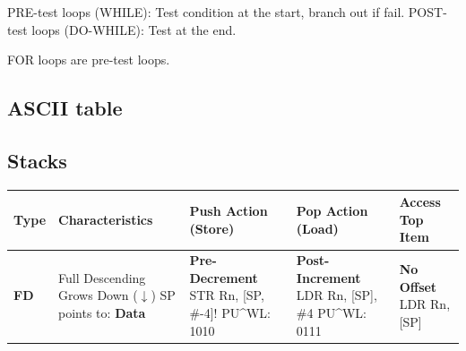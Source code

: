 \documentclass[../comorg-part1.tex]{subfiles}
\begin{document}
\smallskip
\noindent PRE-test loops (WHILE): Test condition at the start, branch out if fail.\newline
POST-test loops (DO-WHILE): Test at the end.\newline

\smallskip
\noindent FOR loops are pre-test loops.

\newpage

\subsection{ASCII table}


\newpage

\begin{landscape}

\subsection{Stacks}

\vspace*{1em} 

\begin{center}
    \begin{minipage}{\linewidth}
        \centering
        \small %
        \renewcommand{\arraystretch}{1.8} 
        \setlength{\tabcolsep}{6pt}   
        
        \begin{tabular}{|l|>{\centering\arraybackslash}p{3.5cm}|>{\centering\arraybackslash}p{4cm}|>{\centering\arraybackslash}p{4cm}|>{\centering\arraybackslash}p{3.5cm}|}
        \hline
        \rowcolor{headergray} 
        \textbf{Type} & \textbf{Characteristics} & \textbf{Push Action (Store)} & \textbf{Pop Action (Load)} & \textbf{Access Top Item} \\ 
        \hline
        
        \textbf{FD} & 
        Full Descending \newline Grows Down ($\downarrow$) \newline SP points to: \textbf{Data} & 
        \textbf{Pre-Decrement} \newline \ttfamily STR Rn, [SP, \#-4]! \newline PU\^{}WL: 1010 & 
        \textbf{Post-Increment} \newline \ttfamily LDR Rn, [SP], \#4 \newline PU\^{}WL: 0111 &
        \textbf{No Offset} \newline \ttfamily LDR Rn, [SP] \\ 
        \hline


\end{tabular}
\end{minipage}
\end{center}
\end{landscape}
\end{document}
